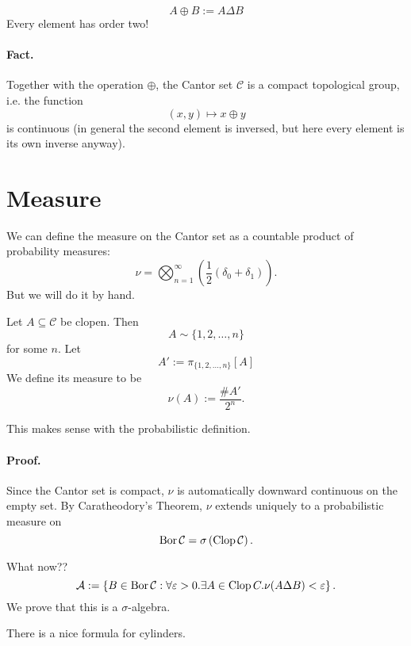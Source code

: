\[ 
    A \oplus B := A \Delta B 
\]
Every element has order two!

\paragraph{Fact.} Together with the operation \( \oplus \), the Cantor set \( \mathcal{C} \) is a compact topological group, i.e. the function
\[ 
    (x, y) \mapsto x \oplus y 
\]
is continuous (in general the second element is inversed, but here every element is its own inverse anyway). 

\section{Measure}

We can define the measure on the Cantor set as a countable product of probability measures:
\[ 
    \nu = \bigotimes_{n=1}^\infty ( \frac{1}{2} (\delta_0 + \delta_1) ).
\]
But we will do it by hand.
\begin{defn}
Let \( A \subseteq \mathcal{C} \) be clopen. Then
\[ 
    A \sim \{1, 2, \ldots, n\} 
\]
for some \( n \). Let
\[ 
    A' := \pi_{\{1, 2, \ldots, n\} }[A]
\]We define its measure to be
\[ 
    \nu (A) := \frac{\# A'}{2^n}.
\]
\end{defn}
This makes sense with the probabilistic definition. 

\paragraph{Proof.} Since the Cantor set is compact, \( \nu \) is automatically downward continuous on the empty set. By Caratheodory's Theorem, \( \nu \) extends uniquely to a probabilistic measure on 
\[ 
    \operatorname{Bor} \mathcal{C} = \sigma \left( \operatorname{Clop} \mathcal{C} \right).
\]

What now??
\[ 
    \mathcal{A} := \left\{ B \in \operatorname{Bor} \mathcal{C} : \forall\varepsilon > 0. \exists A \in \operatorname{Clop} C. \nu (A \Delta B) <\varepsilon \right\}.
\]
We prove that this is a \( \sigma \)-algebra.

There is a nice formula for cylinders.


